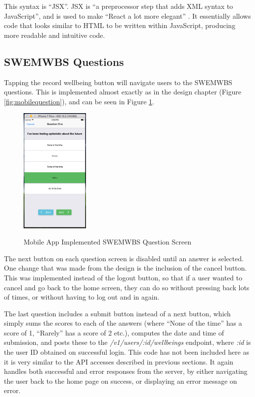 \documentclass[11pt,openright,a4paper]{report}
\begin{document}
This syntax is \enquote{JSX}. JSX is \enquote{a preprocessor step that adds XML syntax to JavaScript}, and is used to make \enquote{React a lot more elegant} \parencite{jsx}. It essentially allows code that looks similar to HTML to be written within JavaScript, producing more readable and intuitive code.

\subsection{SWEMWBS Questions}
Tapping the record wellbeing button will navigate users to the SWEMWBS questions. This is implemented almost exactly as in the design chapter (Figure \ref{fig:mobilequestion}), and can be seen in Figure \ref{fig:mobilequestionimpl}.

\begin{figure}[ht]
\centering
\caption{Mobile App Implemented SWEMWBS Question Screen}
\includegraphics[width=0.3\textwidth]{i/mobilequestionimpl.png}
\label{fig:mobilequestionimpl}
\end{figure}

The next button on each question screen is disabled until an answer is selected. One change that was made from the design is the inclusion of the cancel button. This was implemented instead of the logout button, so that if a user wanted to cancel and go back to the home screen, they can do so without pressing back lots of times, or without having to log out and in again.

The last question includes a submit button instead of a next button, which simply sums the scores to each of the answers (where \enquote{None of the time} has a score of 1, \enquote{Rarely} has a score of 2 etc.), computes the date and time of submission, and posts these to the \emph{/v1/users/:id/wellbeings} endpoint, where \emph{:id} is the user ID obtained on successful login. This code has not been included here as it is very similar to the API accesses described in previous sections. It again handles both successful and error responses from the server, by either navigating the user back to the home page on success, or displaying an error message on error.
\end{document}
